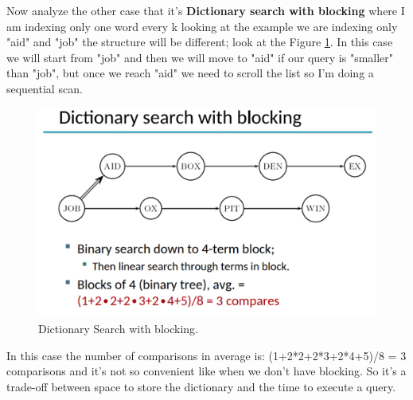 Now analyze the other case that it's \textbf{Dictionary search with blocking} where I am indexing only one word every k looking at the example we are indexing only "aid" and "job" the structure will be different; look at the Figure \ref{fig:dictionarysearchwith}. In this case we will start from "job" and then we will move to "aid" if our query is "smaller" than "job", but once we reach "aid" we need to scroll the list so I'm doing a sequential scan.\newline
\begin{figure}
    \centering
    \includegraphics[width=0.75\linewidth]{images/dictionarysearchwith.png}
    \caption{Dictionary Search with blocking.}
    \label{fig:dictionarysearchwith}
\end{figure}
In this case the number of comparisons in average is: (1+2*2+2*3+2*4+5)/8 = 3 comparisons and it's not so convenient like when we don't have blocking. So it's a trade-off between space to store the dictionary and the time to execute a query.\newline


